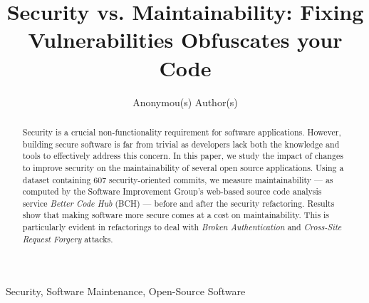 \documentclass[10pt,conference]{IEEEtran}
\begin{document}
\title{Security vs. Maintainability: Fixing Vulnerabilities Obfuscates your Code}

\author{
    Anonymou(s) Author(s)
}

\maketitle

\begin{abstract}
  Security is a crucial non-functionality requirement for software applications.
  However, building secure software is far from trivial as developers lack both
  the knowledge and tools to effectively address this concern. In this paper, we
  study the impact of changes to improve security on the maintainability of several
  open source applications. Using a dataset containing 607 security-oriented
  commits, we measure maintainability --- as computed by the Software Improvement
  Group's web-based source code analysis service \emph{Better Code Hub} (BCH) ---
  before and after the security refactoring. Results show that making software
  more secure comes at a cost on maintainability. This is particularly evident
  in refactorings to deal with \textit{Broken Authentication} and \textit{Cross-Site Request Forgery} attacks.
\end{abstract}

\begin{IEEEkeywords}
Security, Software Maintenance, Open-Source Software
\end{IEEEkeywords}
\end{document}
